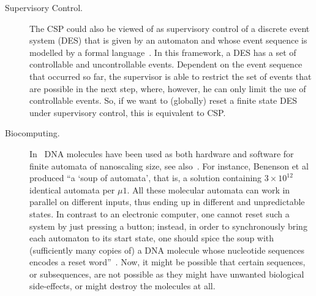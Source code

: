 \begin{description}
\item[Supervisory Control.] The CSP
 could also be viewed of as %
 supervisory control
 of a discrete event system (DES) that is given by an automaton
 and whose event sequence is modelled by a formal language~\cite{DBLP:books/daglib/0034521,RamadgeWonham87,wonham2019}.
 In this framework, a DES has a set of controllable
 and uncontrollable events.
 Dependent
 on the event sequence that occurred so far,
 the supervisor is able to restrict the set of events
 that are possible in the next step, where, however,
 he can only limit the use of controllable events.
 So, if we want to (globally) reset a finite state DES~\cite{Alves2020} under supervisory control, 
 this is equivalent to CSP.


\item[Biocomputing.] In~\cite{Benenson2003,Benenson2001} DNA molecules have been used as both
hardware and software for finite automata of nanoscaling size, see also~\cite{Vol2008}. 
For instance, Benenson et al~\cite{Benenson2003} produced ``a `soup of automata', that is, a solution
containing $3 \times 10^{12}$ identical automata per $\mu1$. All these molecular
automata can work in parallel on different inputs, thus ending up in different
and unpredictable states. In contrast to an electronic computer, one cannot
reset such a system by just pressing a button; instead, in order to synchronously bring
each automaton to its start state, one should spice the soup with (sufficiently
many copies of) a DNA molecule whose nucleotide sequences encodes a reset word''~\cite{Vol2008}.
Now, it might be possible that certain sequences, or subsequences,
are not possible as they might have unwanted biological side-effects, 
or might destroy the molecules at all.


\end{description}
